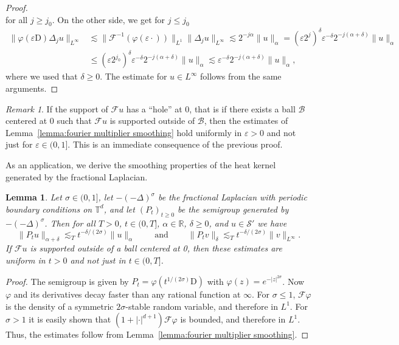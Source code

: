 \documentclass[a4paper,11pt]{article}
\newcommand{\cdummy}{\cdot}
\newcommand{\mathD}{\mathrm{D}}
\newcommand{\nosymbol}{}
\newcommand{\tmop}[1]{\ensuremath{\operatorname{#1}}}
\newtheorem{lemma}[theorem]{Lemma}
\theoremstyle{remark}
\newtheorem{remark}[theorem]{Remark}
\newcommand{\R}{\mathbb{R}}
\newcommand{\CB}{\ensuremath{\mathscr{B}}}
\newcommand{\CF}{\ensuremath{\mathscr{F}}}
\newcommand{\CS}{\ensuremath{\mathscr{S}}}
\begin{document}
\begin{proof}
\[  \]
  for all $j \geqslant j_{0}$. On the other side, we get for $j \leqslant j_{0}$
  \begin{align*}
     \| \varphi ( \varepsilon \mathD ) \Delta_{j} u \|_{L^{\infty}} &\lesssim \| \CF^{-1} ( \varphi ( \varepsilon \cdummy ) ) \|_{L^{1}} \| \Delta_{j} u \|_{L^{\infty}} \lesssim 2^{-j \alpha} \| u \|_{\alpha} = ( \varepsilon 2^{j} )^{\delta} \varepsilon^{- \delta} 2^{-j ( \alpha +  \delta )} \| u \|_{\alpha} \\
     & \leqslant ( \varepsilon 2^{j_{0}} )^{\delta} \varepsilon^{- \delta} 2^{-j ( \alpha + \delta )} \| u \|_{\alpha} \lesssim \varepsilon^{- \delta} 2^{-j ( \alpha + \delta )} \| u \|_{\alpha},
  \end{align*}
  where we used that $\delta \geqslant 0$. The estimate for $u \in L^{\infty}$ follows from the same arguments.
\end{proof}

\begin{remark}
   If the support of $\CF u$ has a ``hole'' at 0, that is if there exists a ball $\CB$ centered at 0 such that $\CF u$ is supported outside of $\CB$, then the estimates of Lemma~\ref{lemma:fourier multiplier smoothing} hold uniformly in $\varepsilon > 0$ and not just for $\varepsilon \in (0,1]$. This is an immediate consequence of the previous proof.
\end{remark}

As an application, we derive the smoothing properties of the heat kernel generated by the fractional Laplacian.

\begin{lemma}\label{lemma:heat flow smoothing}
   Let $\sigma \in ( 0,1 ]$, let $- ( - \Delta )^{\sigma}$ be the fractional Laplacian with periodic boundary conditions on $\mathbb{T}^{d} \nosymbol$, and let $( P_{t} )_{t \geqslant 0}$ be the semigroup generated by $- ( - \Delta )^{\sigma}$. Then for all $T>0$, $t \in (0,T]$, $\alpha \in \R$, $\delta \geqslant 0$, and $u \in \CS'$ we have
  \[
     \|P_{t} u\|_{\alpha + \delta} \lesssim_T t^{- \delta / ( 2 \sigma )} \|u\|_{\alpha} \hspace{2em} \tmop{and} \hspace{2em} \| P_{t} v \|_{\delta} \lesssim_T t^{- \delta / ( 2 \sigma )} \| v \|_{L^{\infty}} .
  \]
  If $\CF u$ is supported outside of a ball centered at 0, then these estimates are uniform in $t > 0$ and not just in $t \in (0,T]$.
\end{lemma}

\begin{proof}
  The semigroup is given by $P_{t} = \varphi ( t^{1/ ( 2 \sigma )} \mathD )$ with $\varphi ( z ) =e^{- | z |^{2 \sigma}}$. Now $\varphi$ and its derivatives decay faster than any rational function at $\infty$. For $\sigma \leqslant 1$, $\CF \varphi$ is the density of a symmetric $2 \sigma$-stable random variable, and therefore in $L^{1}$. For $\sigma > 1$ it is easily shown that $(1+|\cdot|^{d+1}) \CF \varphi$ is bounded, and therefore in $L^1$. Thus, the estimates follow from Lemma~\ref{lemma:fourier multiplier smoothing}.
\end{proof}
\end{document}
